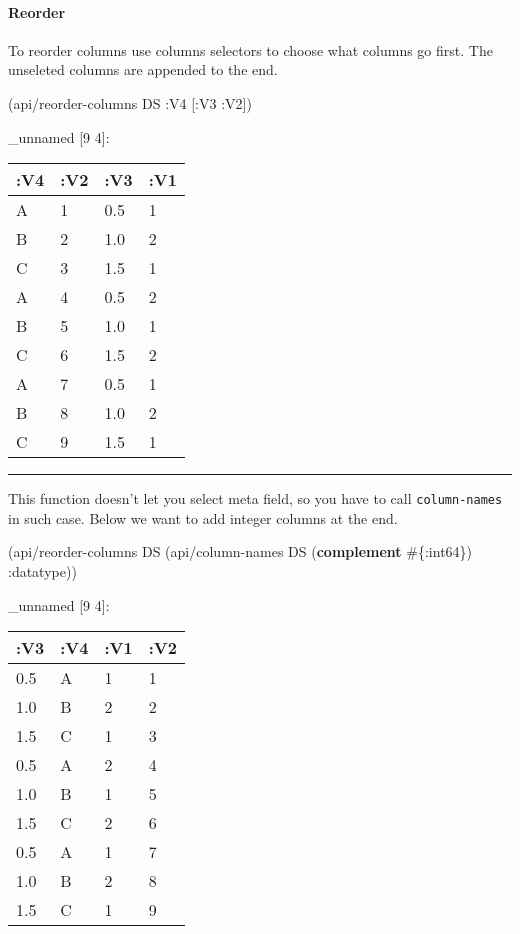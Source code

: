 \documentclass[]{article}
\newenvironment{Shaded}{\begin{snugshade}}{\end{snugshade}}
\newcommand{\AttributeTok}[1]{\textcolor[rgb]{0.77,0.63,0.00}{#1}}
\newcommand{\KeywordTok}[1]{\textcolor[rgb]{0.13,0.29,0.53}{\textbf{#1}}}
\newcommand{\NormalTok}[1]{#1}
\let\oldparagraph\paragraph
\renewcommand{\paragraph}[1]{\oldparagraph{#1}\mbox{}}
\begin{document}
\hypertarget{reorder}{%
\paragraph{Reorder}\label{reorder}}

To reorder columns use columns selectors to choose what columns go
first. The unseleted columns are appended to the end.

\begin{Shaded}
\begin{Highlighting}[]
\NormalTok{(api/reorder-columns DS }\AttributeTok{:V4}\NormalTok{ [}\AttributeTok{:V3} \AttributeTok{:V2}\NormalTok{])}
\end{Highlighting}
\end{Shaded}

\_unnamed {[}9 4{]}:

\begin{longtable}[]{@{}llll@{}}
\toprule
:V4 & :V2 & :V3 & :V1\tabularnewline
\midrule
\endhead
A & 1 & 0.5 & 1\tabularnewline
B & 2 & 1.0 & 2\tabularnewline
C & 3 & 1.5 & 1\tabularnewline
A & 4 & 0.5 & 2\tabularnewline
B & 5 & 1.0 & 1\tabularnewline
C & 6 & 1.5 & 2\tabularnewline
A & 7 & 0.5 & 1\tabularnewline
B & 8 & 1.0 & 2\tabularnewline
C & 9 & 1.5 & 1\tabularnewline
\bottomrule
\end{longtable}

\begin{center}\rule{0.5\linewidth}{0.5pt}\end{center}

This function doesn't let you select meta field, so you have to call
\texttt{column-names} in such case. Below we want to add integer columns
at the end.

\begin{Shaded}
\begin{Highlighting}[]
\NormalTok{(api/reorder-columns DS (api/column-names DS (}\KeywordTok{complement}\NormalTok{ #\{}\AttributeTok{:int64}\NormalTok{\}) }\AttributeTok{:datatype}\NormalTok{))}
\end{Highlighting}
\end{Shaded}

\_unnamed {[}9 4{]}:

\begin{longtable}[]{@{}llll@{}}
\toprule
:V3 & :V4 & :V1 & :V2\tabularnewline
\midrule
\endhead
0.5 & A & 1 & 1\tabularnewline
1.0 & B & 2 & 2\tabularnewline
1.5 & C & 1 & 3\tabularnewline
0.5 & A & 2 & 4\tabularnewline
1.0 & B & 1 & 5\tabularnewline
1.5 & C & 2 & 6\tabularnewline
0.5 & A & 1 & 7\tabularnewline
1.0 & B & 2 & 8\tabularnewline
1.5 & C & 1 & 9\tabularnewline
\bottomrule
\end{longtable}
\end{document}
